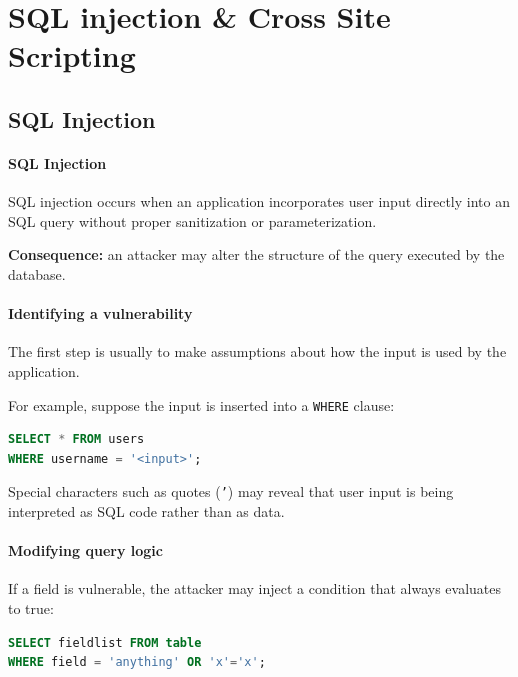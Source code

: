 \section{SQL injection \& Cross Site Scripting}
\subsection{SQL Injection}
\paragraph{SQL Injection}

SQL injection occurs when an application incorporates user input directly into an SQL query without proper sanitization or parameterization.

\vspace{0.3em}

\textbf{Consequence:} an attacker may alter the structure of the query executed by the database.

\paragraph{Identifying a vulnerability}

The first step is usually to make assumptions about how the input is used by the application.

\vspace{0.3em}

For example, suppose the input is inserted into a \texttt{WHERE} clause:

\begin{lstlisting}[language=SQL]
SELECT * FROM users
WHERE username = '<input>';
\end{lstlisting}

\vspace{0.3em}

Special characters such as quotes (\texttt{'}) may reveal that user input is being interpreted as SQL code rather than as data.

\paragraph{Modifying query logic}

If a field is vulnerable, the attacker may inject a condition that always evaluates to true:

\begin{lstlisting}[language=SQL]
SELECT fieldlist FROM table
WHERE field = 'anything' OR 'x'='x';
\end{lstlisting}

